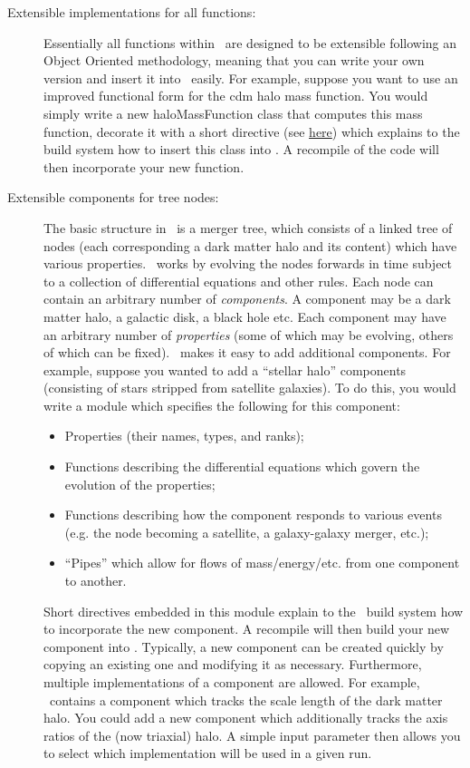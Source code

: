 \begin{description}
 \item [Extensible implementations for all functions:] Essentially all functions within \glc\ are designed to be extensible following an Object Oriented methodology, meaning that you can write your own version and insert it into \glc\ easily. For example, suppose you want to use an improved functional form for the \gls{cdm} halo mass function. You would simply write a new {\normalfont \ttfamily haloMassFunction} class that computes this mass function, decorate it with a short directive (see \href{https://github.com/galacticusorg/galacticus/releases/download/masterRelease/Galacticus_Development.pdf#sec.CodeDirectives}{here}) which explains to the build system how to insert this class into \glc. A recompile of the code will then incorporate your new function.

 \item [Extensible components for tree nodes:] The basic structure in \glc\ is a merger tree, which consists of a linked tree of nodes (each corresponding a dark matter halo and its content) which have various properties. \glc\ works by evolving the nodes forwards in time subject to a collection of differential equations and other rules. Each node can contain an arbitrary number of \emph{components}. A component may be a dark matter halo, a galactic disk, a black hole etc. Each component may have an arbitrary number of \emph{properties} (some of which may be evolving, others of which can be fixed). \glc\ makes it easy to add additional components. For example, suppose you wanted to add a ``stellar halo'' components (consisting of stars stripped from satellite galaxies). To do this, you would write a module which specifies the following for this component:
 \begin{itemize}
  \item Properties (their names, types, and ranks);
  \item Functions describing the differential equations which govern the evolution of the properties;
  \item Functions describing how the component responds to various events (e.g. the node becoming a satellite, a galaxy-galaxy merger, etc.);
  \item ``Pipes'' which allow for flows of mass/energy/etc. from one component to another.
 \end{itemize}
 Short directives embedded in this module explain to the \glc\ build system how to incorporate the new component. A recompile will then build your new component into \glc. Typically, a new component can be created quickly by copying an existing one and modifying it as necessary. Furthermore, multiple implementations of a component are allowed. For example, \glc\ contains a component which tracks the scale length of the dark matter halo. You could add a new component which additionally tracks the axis ratios of the (now triaxial) halo. A simple input parameter then allows you to select which implementation will be used in a given run.


\end{description}
